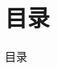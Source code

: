 \begin{frame}
	\titlepage
\end{frame}

\section*{目录}
\label{sec:toc}
\begin{frame}{目录}
	\begin{multicols}{2}
		\tableofcontents
	\end{multicols}
\end{frame}
